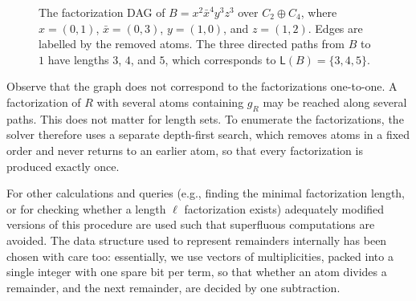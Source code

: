 \documentclass[a4paper, 10pt]{amsart}
\theoremstyle{plain}
\theoremstyle{definition}
\theoremstyle{definition}
\numberwithin{equation}{section}
\begin{document}
\begin{figure}
   \centering
   \caption{The factorization DAG of
     $B=x^2\bar{x}^4y^3z^3$ over $C_2\oplus C_4$,
	 where $x = (0, 1)$, $\bar{x} = (0, 3)$, $y = (1, 0)$, and $z = (1, 2)$.
     Edges are labelled by the removed atoms. The three directed paths
     from $B$ to $1$ have lengths $3$, $4$, and $5$, which corresponds to $\mathsf{L}(B) = \{3, 4, 5\}$.}
	 \label{fig:factorization-dag}
\end{figure}

Observe that the graph does not correspond to the factorizations one-to-one.
A factorization of $R$ with several atoms containing $g_R$ may be reached
along several paths.  This does not matter for length sets.  To enumerate
the factorizations, the solver therefore uses a separate depth-first search,
which removes atoms in a fixed order and never returns to an
earlier atom, so that every factorization is produced exactly once.

For other calculations and queries (e.g., finding the minimal factorization length, or for checking whether a length $\ell$ factorization exists) adequately
modified versions of this procedure are used such that superfluous computations
are avoided. The data structure used to represent remainders internally
has been chosen with care too: essentially, we use vectors of
multiplicities, packed into a single integer with one spare bit per term,
so that whether an atom divides a remainder, and the next remainder, are
decided by one subtraction.
\end{document}
